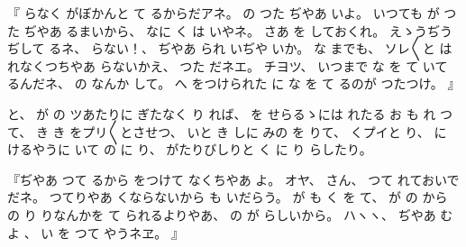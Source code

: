 %
『
らなく
がぼかんと
て
るからだアネ。
%
の
つた
ぢやあ
いよ。
%
いつても
が
つた
ぢやあ
るまいから、
%
なに
く
は
いやネ。
%
さあ
を
しておくれ。
%
えゝうぢうぢして
るネ、
%
らない！、
%
ぢやあ
られ
いぢや
いか。
%
な
までも、
%
ソレ〳〵と
はれなくつちやあ
らないかえ、
%
つた
だネエ。
%
チヨツ、
%
いつまで
な
を
て
いて
るんだネ、
%
の
なんか
して。
%
へ
をつけられた
に
な
を
て
るのが
つたつけ。
』

%
と、
%
が
の
ツあたりに
ぎたなく
り
れば、
%
を
せらるゝには
れたる
お
も
れ
つて、
%
き
き
をプリ〳〵とさせつ、
%
いと
き
しに
みの
を
りて、
%
くプイと
り、
%
に
けるやうに
いて
の
に
り、
%
がたりびしりと
く
に
り
らしたり。

%
『ぢやあ
つて
るから
をつけて
なくちやあ
よ。
%
オヤ、
%
さん、
%
つて
れておいでだネ。
%
つてりやあ
くならないから
も
いだらう。
%
が
も
く
を
て、
%
が
の
から
の
り
りなんかを
て
られるよりやあ、
%
の
が
らしいから。
%
ハヽヽ、
%
ぢやあ
むよ
、
%
い
を
つて
やうネヱ。
』

